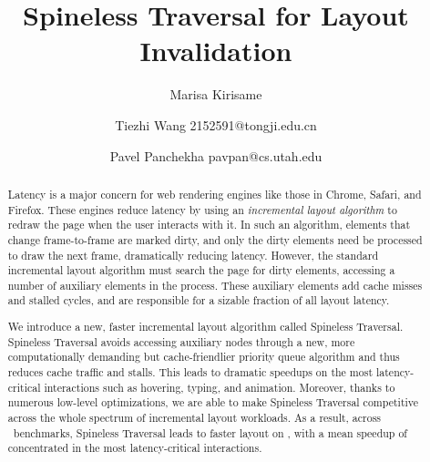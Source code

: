 \documentclass[acmsmall, screen]{acmart}
\begin{document}
\title[Spineless]{Spineless Traversal for Layout Invalidation}  
\author{Marisa Kirisame}
\author{Tiezhi Wang {2152591@tongji.edu.cn}}
\author{Pavel Panchekha {pavpan@cs.utah.edu}}

\begin{abstract}
Latency is a major concern for web rendering engines
  like those in Chrome, Safari, and Firefox.
These engines reduce latency by using
  an \emph{incremental layout algorithm}
  to redraw the page when
  the user interacts with it.
In such an algorithm,
  elements that change frame-to-frame are marked dirty, and
  only the dirty elements need be processed
  to draw the next frame,
  dramatically reducing latency.
However, the standard incremental layout algorithm
  must search the page for dirty elements,
  accessing a number of auxiliary elements
  in the process.
These auxiliary elements
  add cache misses and stalled cycles,
  and are responsible for a sizable fraction
  of all layout latency.

We introduce a new, faster incremental layout algorithm
  called Spineless Traversal.
Spineless Traversal
  avoids accessing auxiliary nodes
  through a new, 
  more computationally demanding
  but cache-friendlier priority queue algorithm
  and thus reduces cache traffic and stalls.
This leads to dramatic speedups
  on the most latency-critical interactions
  such as hovering, typing, and animation.
Moreover, thanks to numerous low-level optimizations,
  we are able to make Spineless Traversal
  competitive across the whole spectrum of
  incremental layout workloads.
As a result, across \NumFrames~benchmarks,
  Spineless Traversal leads
  to faster layout on \PctFaster,
  with a mean speedup of \MeanSpeedup
  concentrated in the most latency-critical interactions.
\end{abstract}
\end{document}
